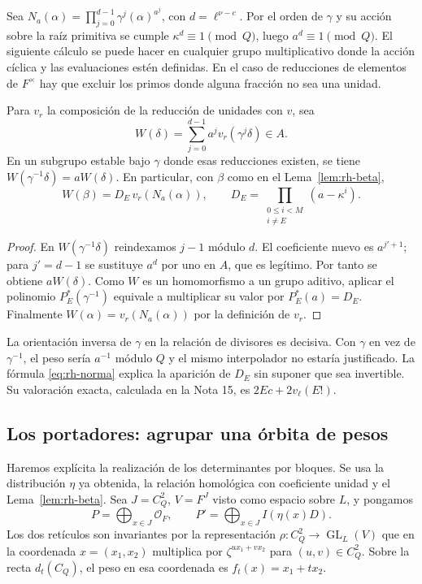 Sea $N_a(\alpha)=\prod_{j=0}^{d-1}\gamma^j(\alpha)^{a^j}$, con $d=\ell^{\nu-c}$. Por el orden de $\gamma$ y su acción sobre la raíz primitiva se cumple $\kappa^d\equiv1\pmod Q$, luego $a^d\equiv1\pmod Q$. El siguiente cálculo se puede hacer en cualquier grupo multiplicativo donde la acción cíclica y las evaluaciones estén definidas. En el caso de reducciones de elementos de $F^\times$ hay que excluir los primos donde alguna fracción no sea una unidad.

\begin{lema}
\label{lem:rh-norma}
Para $v_r$ la composición de la reducción de unidades con $v$, sea
\[
 W(\delta)=\sum_{j=0}^{d-1}a^j v_r(\gamma^j\delta)\in A.
\]
En un subgrupo estable bajo $\gamma$ donde esas reducciones existen, se tiene $W(\gamma^{-1}\delta)=aW(\delta)$. En particular, con $\beta$ como en el Lema~\ref{lem:rh-beta},
\begin{equation}
 W(\beta)=D_E\,v_r(N_a(\alpha)),\qquad
 D_E=\prod_{\substack{0\le i<M\\i\ne E}}(a-\kappa^i).
 \label{eq:rh-norma}
\end{equation}
\end{lema}
\begin{proof}
En $W(\gamma^{-1}\delta)$ reindexamos $j-1$ módulo $d$. El coeficiente nuevo es $a^{j'+1}$; para $j'=d-1$ se sustituye $a^d$ por uno en $A$, que es legítimo. Por tanto se obtiene $aW(\delta)$. Como $W$ es un homomorfismo a un grupo aditivo, aplicar el polinomio $P_E^*(\gamma^{-1})$ equivale a multiplicar su valor por $P_E^*(a)=D_E$. Finalmente $W(\alpha)=v_r(N_a(\alpha))$ por la definición de $v_r$.
\end{proof}

La orientación inversa de $\gamma$ en la relación de divisores es decisiva. Con $\gamma$ en vez de $\gamma^{-1}$, el peso sería $a^{-1}$ módulo $Q$ y el mismo interpolador no estaría justificado. La fórmula \eqref{eq:rh-norma} explica la aparición de $D_E$ sin suponer que sea invertible. Su valoración exacta, calculada en la Nota 15, es $2Ec+2v_\ell(E!)$.

\subsection{Los portadores: agrupar una órbita de pesos}

Haremos explícita la realización de los determinantes por bloques. Se usa la distribución $\eta$ ya obtenida, la relación homológica con coeficiente unidad y el Lema~\ref{lem:rh-beta}. Sea $J=C_Q^2$, $V=F^J$ visto como espacio sobre $L$, y pongamos
\begin{equation}
 P=\bigoplus_{x\in J}\mathcal O_F,\qquad
 P'=\bigoplus_{x\in J} I(\eta(x)D).
 \label{eq:rh-reticulos}
\end{equation}
Los dos retículos son invariantes por la representación $\rho:C_Q^2\to\operatorname{GL}_L(V)$ que en la coordenada $x=(x_1,x_2)$ multiplica por $\zeta^{u x_1+v x_2}$ para $(u,v)\in C_Q^2$. Sobre la recta $d_t(C_Q)$, el peso en esa coordenada es $f_t(x)=x_1+tx_2$.

